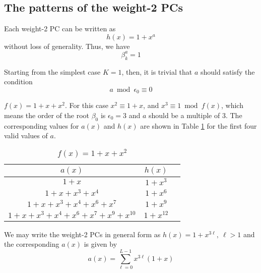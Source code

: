\subsection{The patterns of the weight-2 PCs}
Each weight-2 PC can be written as 
\begin{equation}
h(x)=1+x^a
\label{eq:wt2-gen-form}
\end{equation}
without loss of generality. Thus, we have 
\begin{equation}
\beta_k^a =1
\label{novelEq5b}
\end{equation}

Starting from the simplest case $K=1$, then, it is trivial that $a$ should satisfy the condition
$$a \bmod \epsilon_0  \equiv 0$$

\begin{example}$f(x)=1+x+x^2$.\newline 
For this case $x^2 \equiv 1+x$, and $x^3 \equiv 1 \bmod f(x)$, which means the order of the root $\beta_0$ is $\epsilon_0=3$ and $a$ should be a multiple of $3$. The corresponding values for $a(x)$ and $h(x)$ are shown in Table \ref{novelTab2} for the first four valid values of $a$.
\begin{table}[htbp]
 \caption{$f(x)=1+x+x^2$}
\centering
 \begin{tabular}{c c c} 
 $a(x)$ & $h(x)$ \\ [0.5ex] 
 \hline\hline
$1+x$
 & $1+x^{3}$ \\
\hline
$1+x+x^3+x^4$
 & $1+x^{6}$ 
 \\
\hline
$1+x+x^3+x^4+x^6+x^{7}$ 
&  $1+x^{9}$ 
\\
\hline
$1+x+x^3+x^4+x^6+x^{7}+x^9+x^{10}$
 &  $1+x^{12}$ \\
 \end{tabular}
 \label{novelTab2}
\end{table}
\label{ex-2}
We may write the weight-2 PCs in general form as $h(x)=1+x^{3\ell},~\ell>1$ and the corresponding $a(x)$ is given by 
\begin{equation*}
a(x)=\sum_{\ell=0}^{L-1} x^{3\ell}(1+x)
\end{equation*}
\end{example}
